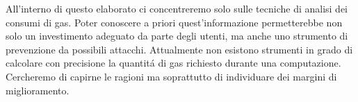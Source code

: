 All'interno di questo elaborato ci concentreremo solo sulle tecniche di analisi dei consumi di gas. Poter conoscere a priori quest'informazione permetterebbe non solo un investimento adeguato da parte degli utenti, ma anche uno strumento di prevenzione da possibili attacchi.\newline
\indent Attualmente non esistono strumenti in grado di calcolare con precisione la quantitá di gas richiesto durante una computazione. Cercheremo di capirne le ragioni ma soprattutto di individuare dei margini di miglioramento.
\newline
